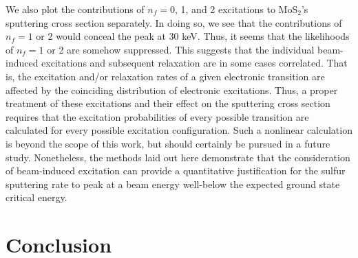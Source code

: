 \documentclass{article}
\begin{document}
We also plot the contributions of $n_f = 0$, 1, and 2 excitations to MoS$_2$'s
sputtering cross section separately.
In doing so, we see that the contributions of $n_f = 1$ or 2 would conceal the
peak at 30 keV. 
Thus, it seems that the likelihoods of $n_f = 1$ or 2 are somehow suppressed.
This suggests that the individual beam-induced excitations and subsequent
relaxation are in some cases correlated.  That is, the excitation and/or
relaxation rates of a given electronic transition are affected by the
coinciding distribution of electronic excitations.
Thus, a proper treatment of these excitations and their effect on the sputtering
cross section requires that the excitation probabilities of every possible
transition are calculated for every possible excitation configuration.
Such a nonlinear calculation is beyond the scope of this work, but
should certainly be pursued in a future study.
Nonetheless, the methods laid out here demonstrate that the consideration of
beam-induced excitation can provide a quantitative justification for the sulfur
sputtering rate to peak at a beam energy well-below the expected ground state
critical energy.

\section{Conclusion}
\label{sec:conclusion}
\end{document}
